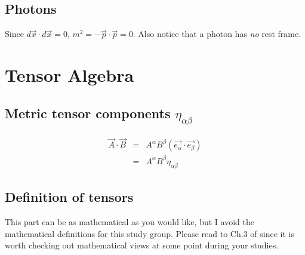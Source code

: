 \documentclass{article}
\theoremstyle{plain}
\theoremstyle{definition}
\newtheorem{defn}[thm]{Definition} %
\begin{document}
\subsection{Photons}
Since $d\vec{x} \cdot d\vec{x} = 0$, $m^2 = -\vec{p}\cdot\vec{p} = 0$. Also notice that a photon has \textit{no} rest frame.

\section{Tensor Algebra} \label{sec:ta}

\subsection{Metric tensor components $\eta_{\alpha\beta}$}

\begin{eqnarray}
    \vec{A} \cdot \vec{B} & = & A^\alpha B^\beta (\vec{e_\alpha} \cdot \vec{e_\beta})\nonumber\\
    & = & A^\alpha B^\beta \eta_{\alpha\beta}\nonumber
\end{eqnarray}

\subsection{Definition of tensors}

This part can be as mathematical as you would like, but I avoid the mathematical definitions for this study group. Please read to Ch.3 of \citet{1985schutz} since it is worth checking out mathematical views at some point during your studies.
\begin{comment}
\begin{defn} \textbf{Tensor of type $\binom{0}{N}$} is a function of $N$ vectors into the real numbers, which is linear in each of its $N$ arguments. \end{defn}

\noindent \textit{(example)} \textbf{metric tensor} $\mathbf{g}$
\begin{equation}
    \mathbf{g}(\vec{A},\vec{B}) := \vec{A} \cdot \vec{B}
\end{equation}

\begin{defn} \textbf{Components of a tensor} of type $\binom{0}{N}$ are the values of the function when its arguments are the basis vectors ${\vec{e_\alpha}}$ of the frame. $\mathbf{g}(\vec{e_\alpha},\vec{e_\beta})$. \end{defn}
\end{comment}
\end{document}
